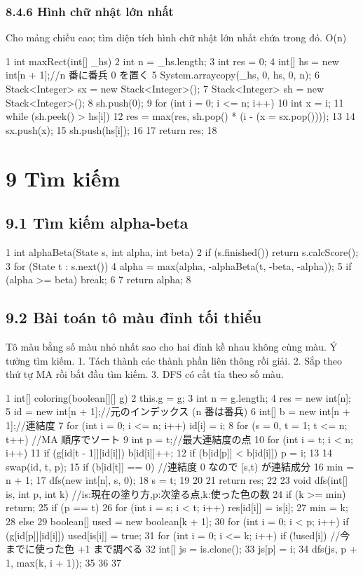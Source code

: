\documentclass[11pt]{article}
\begin{document}
\subsubsection{8.4.6 Hình chữ nhật lớn nhất}
\begin{NoteBlock}
Cho mảng chiều cao; tìm diện tích hình chữ nhật lớn nhất chứa trong đó.
O(n)
\end{NoteBlock}
\begin{Code}
1 int maxRect(int[] _hs) {
2 int n = _hs.length;
3 int res = 0;
4 int[] hs = new int[n + 1];//n 番に番兵 0 を置く
5 System.arraycopy(_hs, 0, hs, 0, n);
6 Stack<Integer> sx = new Stack<Integer>();
7 Stack<Integer> sh = new Stack<Integer>();
8 sh.push(0);
9 for (int i = 0; i <= n; i++) {
10 int x = i;
11 while (sh.peek() > hs[i]) {
12 res = max(res, sh.pop() * (i - (x = sx.pop())));
13 }
14 sx.push(x);
15 sh.push(hs[i]);
16 }
17 return res;
18 }
\end{Code}
\section{9 Tìm kiếm}
\subsection{9.1 Tìm kiếm alpha-beta}
\begin{Code}
1 int alphaBeta(State s, int alpha, int beta) {
2 if (s.finished()) return s.calcScore();
3 for (State t : s.next()) {
4 alpha = max(alpha, -alphaBeta(t, -beta, -alpha));
5 if (alpha >= beta) break;
6 }
7 return alpha;
8 }
\end{Code}
\subsection{9.2 Bài toán tô màu đỉnh tối thiểu}
\begin{NoteBlock}
Tô màu bằng số màu nhỏ nhất sao cho hai đỉnh kề nhau không cùng màu.
Ý tưởng tìm kiếm.
1. Tách thành các thành phần liên thông rồi giải.
2. Sắp theo thứ tự MA rồi bắt đầu tìm kiếm.
3. DFS có cắt tỉa theo số màu.
\end{NoteBlock}
\begin{Code}
1 int[] coloring(boolean[][] g) {
2 this.g = g;
3 int n = g.length;
4 res = new int[n];
5 id = new int[n + 1];//元のインデックス (n 番は番兵)
6 int[] b = new int[n + 1];//連結度
7 for (int i = 0; i <= n; i++) id[i] = i;
8 for (s = 0, t = 1; t <= n; t++) {//MA 順序でソート
9 int p = t;//最大連結度の点
10 for (int i = t; i < n; i++) {
11 if (g[id[t - 1]][id[i]]) b[id[i]]++;
12 if (b[id[p]] < b[id[i]]) p = i;
13 }
14 swap(id, t, p);
15 if (b[id[t]] == 0) {//連結度 0 なので [s,t) が連結成分
16 min = n + 1;
17 dfs(new int[n], s, 0);
18 s = t;
19 }
20 }
21 return res;
22 }
23 void dfs(int[] is, int p, int k) {//is:現在の塗り方,p:次塗る点,k:使った色の数
24 if (k >= min) return;
25 if (p == t) {
26 for (int i = s; i < t; i++) res[id[i]] = is[i];
27 min = k;
28 } else {
29 boolean[] used = new boolean[k + 1];
30 for (int i = 0; i < p; i++) if (g[id[p]][id[i]]) used[is[i]] = true;
31 for (int i = 0; i <= k; i++) if (!used[i]) {//今までに使った色 +1 まで調べる
32 int[] js = is.clone();
33 js[p] = i;
34 dfs(js, p + 1, max(k, i + 1));
35 }
36 }
37 }
\end{Code}
\end{document}

